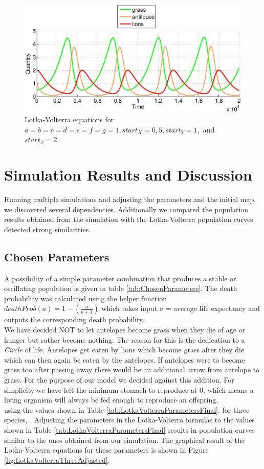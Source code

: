 \documentclass[11pt]{article}
\begin{document}
\begin{figure}
\centering
\includegraphics[scale=0.65]{LotkaVolterraThreeAllOnes}
\caption{Lotka-Volterra equations for $a=b=c=d=e=f=g=1,start_X=0,5, start_Y=1,$ and $start_Z=2$.}
\label{fig:LotkaVolterraThreeAllOnes}
\end{figure}

\section{Simulation Results and Discussion}
Running multiple simulations and adjusting the parameters and the initial map, we discovered several dependencies. Additionally we compared the population results obtained from the simulation with the Lotka-Volterra population curves detected strong similarities.

\subsection{Chosen Parameters}
A possibility of a simple parameter combination that produces a stable or oscillating population is given in table \ref{tab:ChosenParameters}.
The death probability was calculated using the helper function $deathProb(a) = 1-(\frac{a}{a+1})$ which takes input $a$ = average life expectancy and outputs the corresponding death probability.\\
We have decided NOT to let antelopes become grass when they die of age or hunger but rather become nothing. The reason for this is the dedication to a {\it Circle} of life. Antelopes get eaten by lions which become grass after they die which can then again be eaten by the antelopes. If antelopes were to become grass too after passing away there would be an additional arrow from antelope to grass. For the purpose of our model we decided against this addition. For simplicity we have left the minimum stomach to reproduce at 0, which means a living organism will always be fed enough to reproduce an offspring.\\
using the values shown in Table \ref{tab:LotkaVolterraParametersFinal}.
for three species, \cite{lotkaVolterraThreeSpecies}. Adjusting the parameters in the Lotka-Volterra formulas to the values shown in Table \ref{tab:LotkaVolterraParametersFinal} results in  population curves similar to the ones obtained from our simulation. The graphical result of the Lotka-Volterra equations for these parameters is shown in Figure \ref{fig:LotkaVolterraThreeAdjusted}.
\end{document}
